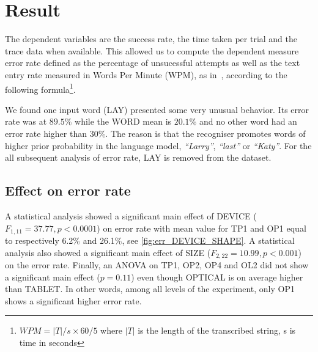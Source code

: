 \documentclass{chi-ext}
\newcommand{\cdt}[1]{{\small\uppercase{{#1}}}}
\begin{document}
\section{Result}
The dependent variables are the success rate, the time taken per trial and the trace data when available. This allowed us to compute the dependent measure error rate defined as the percentage of unsucessful attempts as well as the text entry rate measured in Words Per Minute (WPM), as in~\cite{Markussen2014}, according to the following formula\footnote{$WPM = |T|/s \times 60/5$ where $|T|$ is the length of the transcribed string, s is time in seconds}.

We found one input word (\cdt{lay}) presented some very unusual behavior. Its error rate was at $89.5\%$ while the \cdt{WORD} mean is $20.1\%$ and no other word had an error rate higher than $30\%$. The reason is that the recogniser promotes words of higher prior probability in the language model, \textit{``Larry''}, \textit{``last''} or \textit{``Katy''}. For the all subsequent analysis of error rate, \cdt{lay} is removed from the dataset.

\subsection{Effect on error rate}
A statistical analysis showed a significant main effect of DEVICE ($F_{1,11} = 37.77, p < 0.0001$) on error rate with mean value for \cdt{TP1} and \cdt{OP1} equal to respectively 6.2\% and 26.1\%, see \autoref{fig:err_DEVICE_SHAPE}. A statistical analysis also showed a significant main effect of \cdt{SIZE} ($F_{2,22} = 10.99, p < 0.001$) on the error rate. Finally, an ANOVA on \cdt{TP1}, \cdt{OP2}, \cdt{OP4} and \cdt{OL2} did not show a significant main effect ($p = 0.11$) even though \cdt{OPTICAL} is on average higher than \cdt{TABLET}. In other words, among all levels of the experiment, only \cdt{OP1} shows a significant higher error rate.
\end{document}
